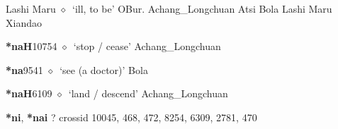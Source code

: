 \begin{list}{}{\leftmargin=1.5em \itemindent=-1.5em}
\hspace{1ex}
         Lashi 
\hspace{1ex}
         Maru 
\hspace{1ex}
         $\diamond$~`ill, to be'
         OBur. 
\hspace{1ex}
         Achang\_Longchuan 
\hspace{1ex}
         Atsi 
\hspace{1ex}
         Bola 
\hspace{1ex}
         Lashi 
\hspace{1ex}
         Maru 
\hspace{1ex}
         Xiandao 
  \item {\footnotesize \textbf{*naH}}{\tiny 10754}
\hspace{1ex}
         $\diamond$~`stop / cease'
         Achang\_Longchuan 
  \item {\footnotesize \textbf{*na}}{\tiny 9541}
\hspace{1ex}
         $\diamond$~`see (a doctor)'
         Bola 
  \item {\footnotesize \textbf{*naH}}{\tiny 6109}
\hspace{1ex}
         $\diamond$~`land / descend'
         Achang\_Longchuan 
  \end{list}
\item
\textbf{*ni}, \textbf{*nai}
?
  {\tiny crossid 10045, 468, 472, 8254, 6309, 2781, 470}
